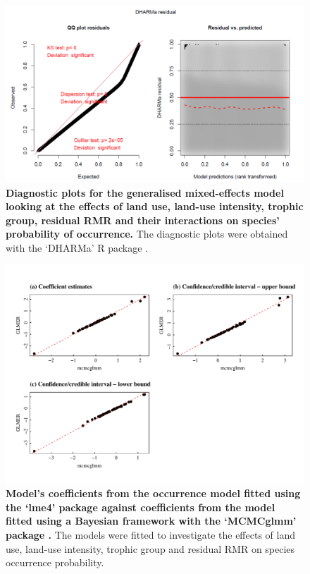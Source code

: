 \begin{figure}[h!]
\centering
\includegraphics[scale=0.7]{Supporting/Chapter5/Figures/Diagnostic_plot_occurrence.png}
\caption[Diagnostic plots for the generalised mixed-effects model looking at the effects of land use, land-use intensity, trophic group, residual RMR and their interactions on species' probability of occurrence]{\textbf{Diagnostic plots for the generalised mixed-effects model looking at the effects of land use, land-use intensity, trophic group, residual RMR and their interactions on species' probability of occurrence.} The diagnostic plots were obtained with the `DHARMa' R package \citep{DHARMa}.}
\label{SI5_figure6}
\end{figure}

\begin{figure}[h!]
\centering
\includegraphics[scale=0.8]{Supporting/Chapter5/Figures/Occurrence_model_GLMER_mcmcglmm_coefs}
\caption[Model's coefficients from the occurrence model fitted using the `lme4' package against coefficients from the model fitted using the `MCMCglmm' package]{\textbf{Model's coefficients from the occurrence model fitted using the `lme4' package \citep{Bates2015} against coefficients from the model fitted using a Bayesian framework with the `MCMCglmm' package \citep{mcmcglmm}.} The models were fitted to investigate the effects of land use, land-use intensity, trophic group and residual RMR on species occurrence probability.}
\label{SI5_figure7}
\end{figure}

